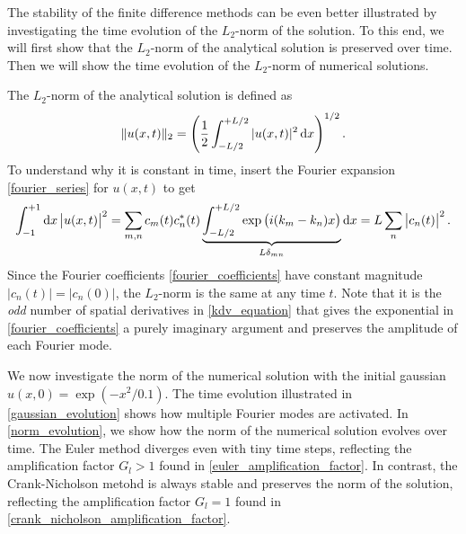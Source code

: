 The stability of the finite difference methods can be even better illustrated by investigating the time evolution of the $L_2$-norm of the solution.
To this end, we will first show that the $L_2$-norm of the analytical solution is preserved over time.
Then we will show the time evolution of the $L_2$-norm of numerical solutions.

The $L_2$-norm of the analytical solution is defined as
\begin{equation*}
	\Vert u(x,t) \Vert_2 = \left( \frac{1}{2} \int_{-L/2}^{+L/2} |u(x,t)|^2 \dif x \right)^{1/2}.
\end{equation*}
To understand why it is constant in time, insert the Fourier expansion \cref{fourier_series} for $u(x,t)$ to get
\begin{equation*}
\int_{-1}^{+1} \dif x \left| u(x,t) \right|^2 = \sum_{m,n} c_m(t) c_n^*(t) \underbrace{\int_{-L/2}^{+L/2} \exp{\left(i(k_m-k_n)x\right)}}_{L \delta_{m n}} \dif x = L \sum_n \left| c_n(t) \right|^2.
\end{equation*}
Since the Fourier coefficients \eqref{fourier_coefficients} have constant magnitude $|c_n(t)| = |c_n(0)|$, the $L_2$-norm is the same at any time $t$.
Note that it is the \emph{odd} number of spatial derivatives in \cref{kdv_equation} that gives the exponential in \cref{fourier_coefficients} a purely imaginary argument and preserves the amplitude of each Fourier mode.

We now investigate the norm of the numerical solution with the initial gaussian $u(x, 0) = \exp \left( -x^2 / 0.1 \right)$.
The time evolution illustrated in \cref{gaussian_evolution} shows how multiple Fourier modes are activated.
In \cref{norm_evolution}, we show how the norm of the numerical solution evolves over time.
The Euler method diverges even with tiny time steps, reflecting the amplification factor $G_l > 1$ found in \cref{euler_amplification_factor}.
In contrast, the Crank-Nicholson metohd is always stable and preserves the norm of the solution, reflecting the amplification factor $G_l = 1$ found in \cref{crank_nicholson_amplification_factor}.

